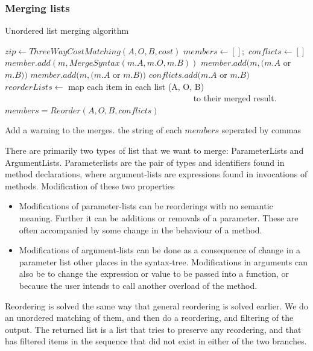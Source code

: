 \documentclass[11pt]{article}
\begin{document}
\subsubsection{Merging lists}
\begin{algorithm}
  \caption{Unordered list merging algorithm}
  \label{Listmerger}
\begin{algorithmic}
    \State $zip \gets ThreeWayCostMatching(A, O, B, cost)$
    \State $members \gets [];$
   	\State $conflicts \gets []$
           \State $member.add(m, MergeSyntax(m.A, m.O, m.B))$
			\State $member.add(m, (m.A$ or $m.B ))$
			\State $member.add(m, (m.A$ or $m.B ))$
			\State $conflicts.add(m.A$ or $m.B )$
		\EndIf
		\State $reorderLists \gets $ map each item in each list (A, O, B)
		\State ~~~~~~~~~~~~~~~~~~~~~~~~~~~~~~~~~~~~~~~~~~~~ to their merged result.
		\State $members = Reorder(A, O, B, conflicts)$
	\EndFor

        \State Add a warning to the merges.
    \EndFor
	\State \Return the string of each $members$ seperated by commas
\EndFunction
\end{algorithmic}
\end{algorithm}


There are primarily two types of list that we want to merge: ParameterLists and ArgumentLists. Parameterlists are the pair of types and identifiers found in method declarations, where argument-lists are expressions found in invocations of methods. Modification of these two properties 

\begin{itemize}
   \item Modifications of parameter-lists can be reorderings with no semantic meaning. Further it can be additions or removals of a parameter. These are often accompanied by some change in the behaviour of a method.
   \item Modifications of argument-lists can be done as a consequence of change in a parameter list other places in the syntax-tree. Modifications in arguments can also be to change the expression or value to be passed into a function, or because the user intends to call another overload of the method.
\end{itemize}

Reordering is solved the same way that general reordering is solved earlier. We do an unordered matching of them, and then do a reordering, and filtering of the output. The returned list is a list that tries to preserve any reordering, and that has filtered items in the sequence that did not exist in either of the two branches.
\end{document}
